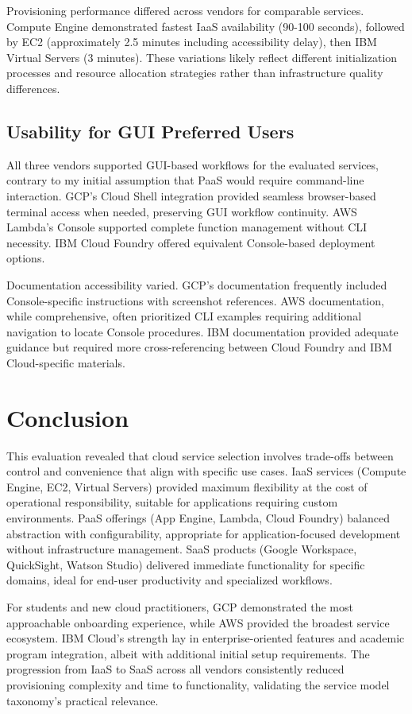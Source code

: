 \documentclass[11pt,a4paper]{article}
\begin{document}
Provisioning performance differed across vendors for comparable services. Compute Engine demonstrated fastest IaaS availability (90-100 seconds), followed by EC2 (approximately 2.5 minutes including accessibility delay), then IBM Virtual Servers (3 minutes). These variations likely reflect different initialization processes and resource allocation strategies rather than infrastructure quality differences.

\subsection{Usability for GUI Preferred Users}

All three vendors supported GUI-based workflows for the evaluated services, contrary to my initial assumption that PaaS would require command-line interaction. GCP's Cloud Shell integration provided seamless browser-based terminal access when needed, preserving GUI workflow continuity. AWS Lambda's Console supported complete function management without CLI necessity. IBM Cloud Foundry offered equivalent Console-based deployment options.

Documentation accessibility varied. GCP's documentation frequently included Console-specific instructions with screenshot references. AWS documentation, while comprehensive, often prioritized CLI examples requiring additional navigation to locate Console procedures. IBM documentation provided adequate guidance but required more cross-referencing between Cloud Foundry and IBM Cloud-specific materials.

\section{Conclusion}

This evaluation revealed that cloud service selection involves trade-offs between control and convenience that align with specific use cases. IaaS services (Compute Engine, EC2, Virtual Servers) provided maximum flexibility at the cost of operational responsibility, suitable for applications requiring custom environments. PaaS offerings (App Engine, Lambda, Cloud Foundry) balanced abstraction with configurability, appropriate for application-focused development without infrastructure management. SaaS products (Google Workspace, QuickSight, Watson Studio) delivered immediate functionality for specific domains, ideal for end-user productivity and specialized workflows.

For students and new cloud practitioners, GCP demonstrated the most approachable onboarding experience, while AWS provided the broadest service ecosystem. IBM Cloud's strength lay in enterprise-oriented features and academic program integration, albeit with additional initial setup requirements. The progression from IaaS to SaaS across all vendors consistently reduced provisioning complexity and time to functionality, validating the service model taxonomy's practical relevance.
\end{document}

